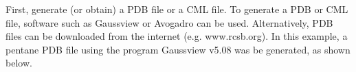 First, generate (or obtain) a PDB file or a CML file. To generate a PDB or CML file, 
software such as Gaussview or Avogadro can be used. Alternatively, PDB files can
be downloaded from the internet (e.g. www.rcsb.org). In this example, a pentane PDB file using the 
program Gaussview v5.08 was be generated, as shown below. \\

%
%
%
%
%
%
%
%
%
%
%
